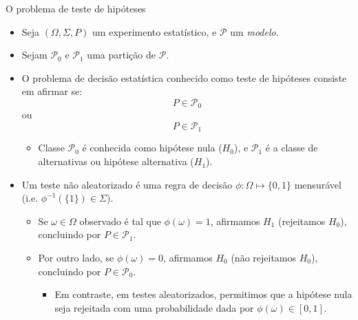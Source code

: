\documentclass[11pt]{beamer}
\begin{document}
\begin{frame}{O problema de teste de hipóteses}
	\begin{itemize}
		\item Seja $(\Omega, \Sigma, P)$ um experimento estatístico, e $\mathcal{P}$ um \emph{modelo}.
		\item Sejam $\mathcal{P}_0$ e $\mathcal{P}_1$ uma partição de $\mathcal{P}$.
		\item O problema de decisão estatística conhecido como teste de hipóteses consiste em afirmar se:
				\vspace{-1em}
		$$ P \in \mathcal{P}_0$$
		ou
		$$P \in \mathcal{P}_1$$
		\vspace{-1em}
		\begin{itemize}
			\item Classe $\mathcal{P}_0$ é conhecida como hipótese nula ($H_0$), e $\mathcal{P}_1$ é a classe de alternativas ou hipótese alternativa ($H_1$).
		\end{itemize}
		\item Um {\color{blue}teste } não aleatorizado é uma regra de decisão $\phi:\Omega \mapsto  \{0,1\}$  mensurável (i.e. $\phi^{-1}(\{1\}) \in \Sigma$).
		
		\begin{itemize}
			\item Se $\omega \in \Omega$ observado é tal que $\phi(\omega) = 1$, afirmamos $H_1$ (rejeitamos $H_0$), concluindo por $P\in \mathcal{P}_1$.
			\item Por outro lado, se  $\phi(\omega) = 0$, afirmamos $H_0$ (não rejeitamos $H_0$), concluindo por $P\in \mathcal{P}_0$.
			\begin{itemize}
				\item Em contraste, em testes aleatorizados, permitimos que a hipótese nula seja rejeitada com uma probabilidade dada por $\phi(\omega) \in [0,1]$.
			\end{itemize}
		\end{itemize}
	\end{itemize}
\end{frame}
\end{document}
